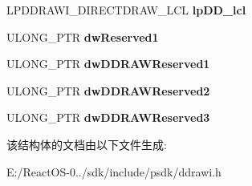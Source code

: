 \begin{DoxyCompactItemize}
L\+P\+D\+D\+R\+A\+W\+I\+\_\+\+D\+I\+R\+E\+C\+T\+D\+R\+A\+W\+\_\+\+L\+CL {\bfseries lp\+D\+D\+\_\+lcl}
\item 
\mbox{\label{struct___d_d_r_a_w_i___d_d_r_a_w_p_a_l_e_t_t_e___l_c_l_a632b06e3c9b34f8370cf2d490e36a3a1}} 
U\+L\+O\+N\+G\+\_\+\+P\+TR {\bfseries dw\+Reserved1}
\item 
\mbox{\label{struct___d_d_r_a_w_i___d_d_r_a_w_p_a_l_e_t_t_e___l_c_l_aebdedcce52272a34792e422615f6259e}} 
U\+L\+O\+N\+G\+\_\+\+P\+TR {\bfseries dw\+D\+D\+R\+A\+W\+Reserved1}
\item 
\mbox{\label{struct___d_d_r_a_w_i___d_d_r_a_w_p_a_l_e_t_t_e___l_c_l_a10d067a9382727568e0fd61f08a32fa0}} 
U\+L\+O\+N\+G\+\_\+\+P\+TR {\bfseries dw\+D\+D\+R\+A\+W\+Reserved2}
\item 
\mbox{\label{struct___d_d_r_a_w_i___d_d_r_a_w_p_a_l_e_t_t_e___l_c_l_ab11224eaa27f122c9c7ee7f1077f6223}} 
U\+L\+O\+N\+G\+\_\+\+P\+TR {\bfseries dw\+D\+D\+R\+A\+W\+Reserved3}
\end{DoxyCompactItemize}


该结构体的文档由以下文件生成\+:\begin{DoxyCompactItemize}
\item 
E\+:/\+React\+O\+S-\/0../sdk/include/psdk/ddrawi.\+h\end{DoxyCompactItemize}
